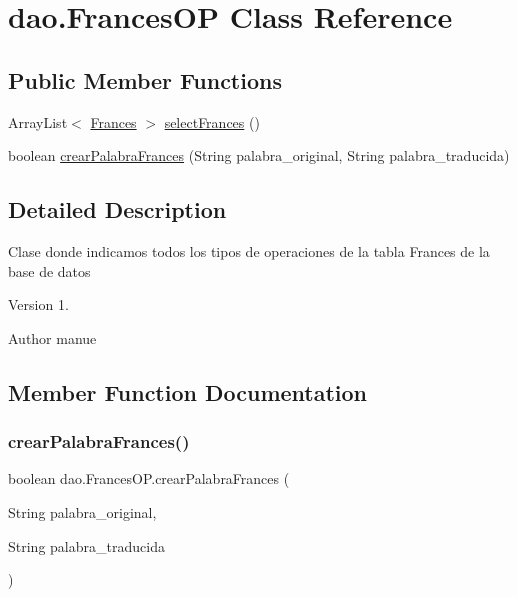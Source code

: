 \hypertarget{classdao_1_1_frances_o_p}{}\section{dao.\+Frances\+OP Class Reference}
\label{classdao_1_1_frances_o_p}
\subsection*{Public Member Functions}
\begin{DoxyCompactItemize}
\item 
Array\+List$<$ \mbox{\hyperlink{classvo_1_1_frances}{Frances}} $>$ \mbox{\hyperlink{classdao_1_1_frances_o_p_a0a5b0c845f18105eaff2474c35d75720}{select\+Frances}} ()
\item 
boolean \mbox{\hyperlink{classdao_1_1_frances_o_p_a7456aaeca1a1ebffacc88907bb93cee4}{crear\+Palabra\+Frances}} (String palabra\+\_\+original, String palabra\+\_\+traducida)
\end{DoxyCompactItemize}


\subsection{Detailed Description}
Clase donde indicamos todos los tipos de operaciones de la tabla Frances de la base de datos \begin{DoxyVersion}{Version}
1. 
\end{DoxyVersion}
\begin{DoxyAuthor}{Author}
manue 
\end{DoxyAuthor}


\subsection{Member Function Documentation}
\mbox{\label{classdao_1_1_frances_o_p_a7456aaeca1a1ebffacc88907bb93cee4}} 
\subsubsection{\texorpdfstring{crearPalabraFrances()}{crearPalabraFrances()}}
{\footnotesize\ttfamily boolean dao.\+Frances\+O\+P.\+crear\+Palabra\+Frances (\begin{DoxyParamCaption}\item[{String}]{palabra\+\_\+original,  }\item[{String}]{palabra\+\_\+traducida }\end{DoxyParamCaption})\hspace{0.3cm}{\ttfamily [inline]}}

